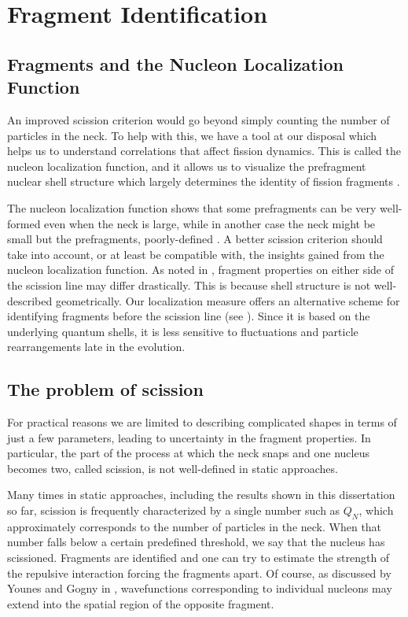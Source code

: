 \chapter{Fragment Identification}\label{chap:Fragments}

\section{Fragments and the Nucleon Localization Function}
An improved scission criterion would go beyond simply counting the number of particles in the neck. To help with this, we have a tool at our disposal which helps us to understand correlations that affect fission dynamics. This is called the nucleon localization function, and it allows us to visualize the prefragment nuclear shell structure which largely determines the identity of fission fragments \cite{Zhang2016}.

The nucleon localization function shows that some prefragments can be very well-formed even when the neck is large, while in another case the neck might be small but the prefragments, poorly-defined \cite{Sadhukhan2017}. A better scission criterion should take into account, or at least be compatible with, the insights gained from the nucleon localization function. As noted in \cite{Younes2009}, fragment properties on either side of the scission line may differ drastically. This is because shell structure is not well-described geometrically. Our localization measure offers an alternative scheme for identifying fragments before the scission line (see \cite{Sadhukhan2017}). Since it is based on the underlying quantum shells, it is less sensitive to fluctuations and particle rearrangements late in the evolution.

\section{The problem of scission}
For practical reasons we are limited to describing complicated shapes in terms of just a few parameters, leading to uncertainty in the fragment properties. In particular, the part of the process at which the neck snaps and one nucleus becomes two, called scission, is not well-defined in static approaches.

Many times in static approaches, including the results shown in this dissertation so far, scission is frequently characterized by a single number such as $Q_N$, which approximately corresponds to the number of particles in the neck. When that number falls below a certain predefined threshold, we say that the nucleus has scissioned. Fragments are identified and one can try to estimate the strength of the repulsive interaction forcing the fragments apart. Of course, as discussed by Younes and Gogny in \cite{Bonneau2007,Younes2011}, wavefunctions corresponding to individual nucleons may extend into the spatial region of the opposite fragment.

